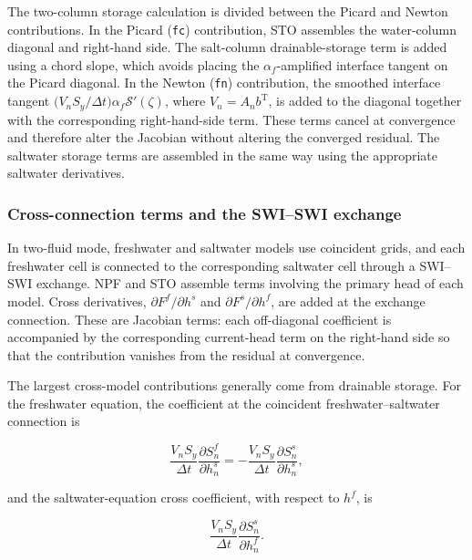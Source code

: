 The two-column storage calculation is divided between the \mf Picard and Newton contributions. In the Picard (\texttt{fc}) contribution, STO assembles the water-column diagonal and right-hand side. The salt-column drainable-storage term is added using a chord slope, which avoids placing the $\alpha_{f}$-amplified interface tangent on the Picard diagonal. In the Newton (\texttt{fn}) contribution, the smoothed interface tangent $\big(V_{n}S_{y}/\Delta t\big)\alpha_{f}\mathcal{S}'(\zeta)$, where $V_{n}=A_{n}b^{\mathrm{T}}$, is added to the diagonal together with the corresponding right-hand-side term. These terms cancel at convergence and therefore alter the Jacobian without altering the converged residual. The saltwater storage terms are assembled in the same way using the appropriate saltwater derivatives.

\subsubsection{Cross-connection terms and the SWI--SWI exchange}
\label{sec:swi-cross}

In two-fluid mode, freshwater and saltwater models use coincident grids, and each freshwater cell is connected to the corresponding saltwater cell through a SWI--SWI exchange. NPF and STO assemble terms involving the primary head of each model. Cross derivatives, $\partial F^{f}/\partial h^{s}$ and $\partial F^{s}/\partial h^{f}$, are added at the exchange connection. These are Jacobian terms: each off-diagonal coefficient is accompanied by the corresponding current-head term on the right-hand side so that the contribution vanishes from the residual at convergence.

The largest cross-model contributions generally come from drainable storage. For the freshwater equation, the coefficient at the coincident freshwater--saltwater connection is

\begin{equation}
\label{eqn:swi-crossf}
\frac{V_{n}S_{y}}{\Delta t}\frac{\partial S_{n}^{f}}{\partial h_{n}^{s}}
=-\frac{V_{n}S_{y}}{\Delta t}\frac{\partial S_{n}^{s}}{\partial h_{n}^{s}},
\end{equation}

\noindent and the saltwater-equation cross coefficient, with respect to $h^{f}$, is

\begin{equation}
\label{eqn:swi-crosss}
\frac{V_{n}S_{y}}{\Delta t}\frac{\partial S_{n}^{s}}{\partial h_{n}^{f}}.
\end{equation}

